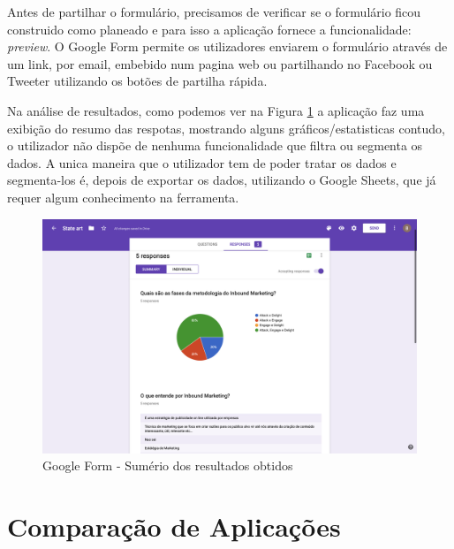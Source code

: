 Antes de partilhar o formulário, precisamos de verificar se o formulário ficou construido como planeado e para isso a aplicação fornece a funcionalidade: \textit{preview}. O Google Form permite os utilizadores enviarem o formulário através de um link, por email, embebido num pagina web ou partilhando no Facebook ou Tweeter utilizando os botões de partilha rápida.

Na análise de resultados, como podemos ver na Figura \ref{fig:gf-form-results} a aplicação faz uma exibição do resumo das respotas, mostrando alguns gráficos/estatisticas contudo, o utilizador não dispõe de nenhuma funcionalidade que filtra ou segmenta os dados. A unica maneira que o utilizador tem de poder tratar os dados e segmenta-los é, depois de exportar os dados, utilizando o Google Sheets, que já requer algum conhecimento na ferramenta. 


\begin{figure}[ht!]
	\begin{center}
		\includegraphics[width=1\textwidth]{img/gf/gf-form-results}
		\caption{Google Form - Sumério dos resultados obtidos}
		\label{fig:gf-form-results}
	\end{center}
\end{figure}


\section{Comparação de Aplicações}
\label{comparacao}


\newpage

